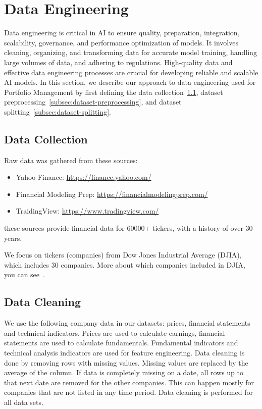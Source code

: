 \documentclass[../xlapes02]{subfiles}
\begin{document}
    \section{Data Engineering}\label{sec:data-engineering}
    Data engineering is critical in AI to ensure quality, preparation, integration, scalability, governance, and performance optimization of models. It involves cleaning, organizing, and transforming data for accurate model training, handling large volumes of data, and adhering to regulations. High-quality data and effective data engineering processes are crucial for developing reliable and scalable AI models. In this section, we describe our approach to data engineering used for Portfolio Management by first defining the data collection~\cref{subsec:data-collection}, dataset preprocessing~\cref{subsec:dataset-preprocessing}, and dataset splitting~\cref{subsec:dataset-splitting}.

    \subsection{Data Collection}\label{subsec:data-collection}
    Raw data was gathered from these sources:
    \begin{itemize}
        \label{item:data-sources}
        \item Yahoo Finance: \url{https://finance.yahoo.com/}
        \item Financial Modeling Prep: \url{https://financialmodelingprep.com/}
        \item TraidingView: \url{https://www.tradingview.com/}
    \end{itemize}
    these sources provide financial data for 60000+ tickers, with a history of over 30 years.

    We focus on tickers (companies) from Dow Jones Industrial Average (DJIA), which includes 30 companies. More about which companies included in DJIA, you can see~\cite{enwiki:1141766585}.

    \subsection{Data Cleaning}\label{subsubsec:data-cleaning}
    We use the following company data in our datasets: prices, financial statements and technical indicators. Prices are used to calculate earnings, financial statements are used to calculate fundamentals. Fundamental indicators and technical analysis indicators are used for feature engineering. Data cleaning is done by removing rows with missing values. Missing values are replaced by the average of the column. If data is completely missing on a date, all rows up to that next date are removed for the other companies. This can happen mostly for companies that are not listed in any time period. Data cleaning is performed for all data sets.
\end{document}
